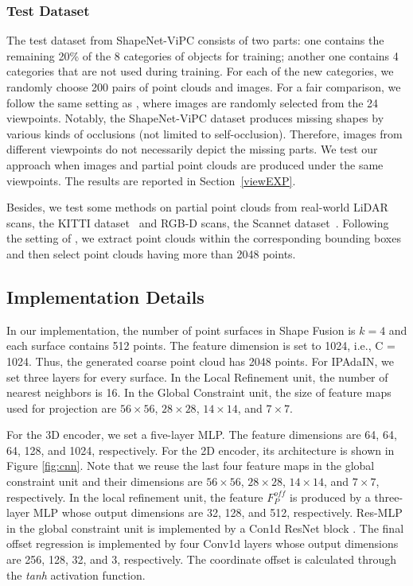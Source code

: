 \subsubsection{Test Dataset}
The test dataset from ShapeNet-ViPC \cite{zhang2021view} consists of two parts: one contains the remaining 20\% of the 8 categories of objects for training; another one contains 4 categories that are not used during training. For each of the new categories, we randomly choose 200 pairs of point clouds and images. For a fair comparison, we follow the same setting as \cite{zhang2021view}, where images are randomly selected from the 24 viewpoints. Notably, the ShapeNet-ViPC dataset produces missing shapes by various kinds of occlusions (not limited to self-occlusion). Therefore, images from different viewpoints do not necessarily depict the missing parts. We test our approach when images and partial point clouds are produced under the same viewpoints. The results are reported in Section~\ref{viewEXP}.

Besides, we test some methods on partial point clouds from real-world LiDAR scans, the KITTI dataset~\cite{geiger2013vision} and RGB-D scans, the Scannet dataset~\cite{dai2017scannet}. Following the setting of \cite{yuan2018pcn}, we extract point clouds within the corresponding bounding boxes and then select point clouds having more than 2048 points.
\subsection{Implementation Details}
\label{detail}
In our implementation, the number of point surfaces in Shape Fusion is $k=4$ and each surface contains 512 points. The feature dimension is set to 1024, i.e., C = 1024. Thus, the generated coarse point cloud has 2048 points. For IPAdaIN, we set three layers for every surface. In the Local Refinement unit, the number of nearest neighbors is 16. In the Global Constraint unit, the size of feature maps used for projection are $56\times56$, $28\times28$, $14\times14$, and $7\times7$.

For the 3D encoder, we set a five-layer MLP. The feature dimensions are 64, 64, 64, 128, and 1024, respectively. For the 2D encoder, its architecture is shown in Figure \ref{fig:cnn}. 
Note that we reuse the last four feature maps in the global constraint unit and their dimensions are $56\times56$, $28\times28$, $14\times14$, and $7\times7$, respectively.
In the local refinement unit, the feature \emph{$F_{P}^{off}$} is produced by a three-layer MLP whose output dimensions are 32, 128, and 512, respectively. Res-MLP in the global constraint unit is implemented by a Con1d ResNet block \cite{he2016deep}. The final offset regression is implemented by four Conv1d layers whose output dimensions are 256, 128, 32, and 3, respectively. The coordinate offset is calculated through the \emph{tanh} activation function.

